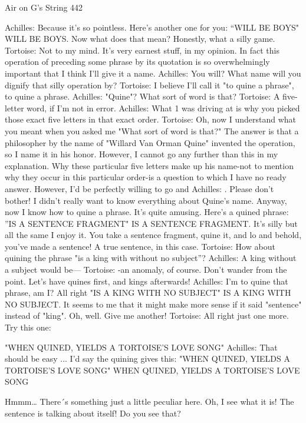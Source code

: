 Air on G's String                                                                        442

Achilles: Because it's so pointless. Here's another one for you:
                           “WILL BE BOYS" WILL BE BOYS.
  Now what does that mean? Honestly, what a silly game.
Tortoise: Not to my mind. It's very earnest stuff, in my opinion. In fact this operation of
  preceding some phrase by its quotation is so overwhelmingly important that I think I'll
  give it a name.
Achilles: You will? What name will you dignify that silly operation by?
Tortoise: I believe I'll call it "to quine a phrase", to quine a phrase.
Achilles: "Quine"? What sort of word is that?
Tortoise: A five-letter word, if I'm not in error.
Achilles: What 1 was driving at is why you picked those exact five letters in that exact
  order.
Tortoise: Oh, now I understand what you meant when you asked me "What sort of word
  is that?" The answer is that a philosopher by the name of "Willard Van Orman Quine"
  invented the operation, so I name it in his honor. However, I cannot go any further
  than this in my explanation. Why these particular five letters make up his name-not to
  mention why they occur in this particular order-is a question to which I have no ready
  answer. However, I'd be perfectly willing to go and
Achilles: . Please don't bother! I didn't really want to know everything about Quine's
  name. Anyway, now I know how to quine a phrase. It's quite amusing. Here's a quined
  phrase:
   ”IS A SENTENCE FRAGMENT" IS A SENTENCE FRAGMENT.
   It's silly but all the same I enjoy it. You take a sentence fragment, quine
   it, and lo and behold, you've made a sentence! A true sentence, in this case.
Tortoise: How about quining the phrase "is a king with without no subject”?
Achilles: A king without a subject would be---
Tortoise: -an anomaly, of course. Don't wander from the point. Let's have quines first,
  and kings afterwards!
Achilles: I'm to quine that phrase, am I? All right
   "IS A KING WITH NO SUBJECT" IS A KING WITH NO SUBJECT.
  It seems to me that it might make more sense if it said "sentence" instead of "king".
  Oh, well. Give me another!
Tortoise: All right just one more. Try this one:

   "WHEN QUINED, YIELDS A TORTOISE'S LOVE SONG"
Achilles: That should be easy ... I'd say the quining gives this:
   "WHEN QUINED, YIELDS A TORTOISE'S LOVE SONG"
   WHEN QUINED, YIELDS A TORTOISE'S LOVE SONG

   Hmmm… There´s something just a little peculiar here. Oh, I see what it is! The
     sentence is talking about itself! Do you see that?


